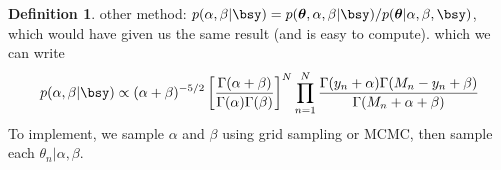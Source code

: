 \documentclass[12pt]{article}
\theoremstyle{plain}
\theoremstyle{definition}
\newtheorem{defn}[thm]{Definition}
\theoremstyle{remark}
\newcommand{\bstheta}{\boldsymbol{\theta}}
\begin{document}
\begin{defn}
{  other method:
  $p(\alpha,\beta|\bsy)=p(\bstheta,\alpha,\beta | \bsy)/
  p(\bstheta|\alpha, \beta , \bsy)$, which would have given us the same
  result (and is easy to compute).
}
which we can write
\begin{align*}
  p(\alpha, \beta | \bsy)
  \propto
  (\alpha + \beta)^{-5/2}
  \left[\frac{\Gamma(\alpha+\beta)}{\Gamma(\alpha) \Gamma(\beta)}
  \right]^N
  \prod^N_{n=1}
  \frac{%
    \Gamma(y_n + \alpha) \Gamma( M_n - y_n + \beta)
  }{\Gamma(M_n + \alpha + \beta)}
\end{align*}
To implement, we sample $\alpha$ and $\beta$ using grid sampling or
MCMC, then sample each $\theta_n | \alpha, \beta$.
\end{defn}




\end{document}
